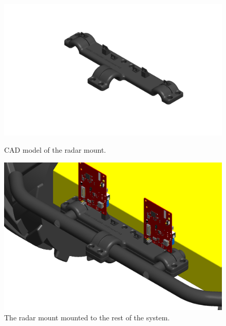 \begin{figure}[H]
    \centering
    \begin{minipage}[b]{0.49\textwidth}
        \includegraphics[width=\textwidth]{Figures/CAD/upperRadarMountV2.PNG}
        \caption{CAD model of the radar mount.}
        \label{fig:upperRadarMountV2}
    \end{minipage}
    \begin{minipage}[b]{0.49\textwidth}
        \includegraphics[width=\textwidth]{Figures/CAD/radarmountMounted.PNG}
        \caption{The radar mount mounted to the rest of the system.}
        \label{fig:radarmountMounted}
    \end{minipage}
\end{figure}
